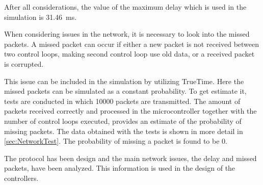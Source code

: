 After all considerations, the value of the maximum delay which is used in the simulation is \SI{31.46}{ms}.

When considering issues in the network, it is necessary to look into the missed packets. A missed packet can occur if either a new packet is not received between two control loops, making second control loop use old data, or a received packet is corrupted.

This issue can be included in the simulation by utilizing TrueTime. Here the missed packets can be simulated as a constant probability. To get estimate it, tests are conducted in which 10000 packets are transmitted. The amount of packets received correctly and processed in the microcontroller together with the number of control loops executed, provides an estimate of the probability of missing packets. The data obtained with the tests is shown in more detail in \autoref{sec:NetworkTest}. The probability of missing a packet is found to be 0.

The protocol has been design and the main network issues, the delay and missed packets, have been analyzed. This information is used in the design of the controllers.


